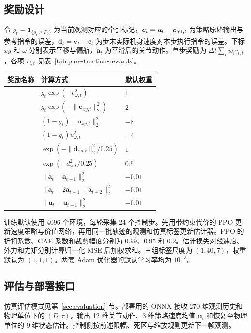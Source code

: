 \begin{samepage}
\subsection{奖励设计}
令 $g_t=\mathbf 1_{\{\rho_t\ge F_0\}}$ 为当前观测对应的牵引标记，$\bm e_t=\bm u_t-\bm c_{{\rm ref},t}$ 为策略原始输出与参考指令的误差，$\bm d_t=\bm v_t-\bm c_t$ 为步末实际机身速度对本步执行指令的误差。下标 $xy$ 和 $\omega$ 分别表示平移与偏航，$\tilde{\bm a}_t$ 为平滑后的关节动作。单步奖励为 $\Delta t\sum_i w_i r_{i,t}$，各项 $r_{i,t}$ 见表~\ref{tab:pure-traction-rewards}。

\par\nobreak\medskip\noindent
\begin{minipage}{\linewidth}
\captionsetup{hypcap=false}
\small
\begin{tabularx}{\linewidth}{@{}P{48mm}Y>{\centering\arraybackslash}p{19mm}@{}}
\toprule
\textbf{奖励名称} & \textbf{计算方式} & \textbf{默认权重} \\
\midrule
{} & $g_t\exp(-e_{\omega,t}^2)$ & $1$ \\
 & $g_t\exp(-\|\bm e_{xy,t}\|_2^2)$ & $2$ \\
 & $(1-g_t)\|\bm u_{xy,t}\|_2^2$ & $-8$ \\
 & $(1-g_t)u_{\omega,t}^2$ & $-4$ \\
 & $\exp(-\|\bm d_{xy,t}\|_2^2/0.25)$ & $1$ \\
 & $\exp(-d_{\omega,t}^2/0.25)$ & $0.5$ \\
 & $\|\tilde{\bm a}_t-\tilde{\bm a}_{t-1}\|_2^2$ & $-0.01$ \\
 & $\|\tilde{\bm a}_t-2\tilde{\bm a}_{t-1}+\tilde{\bm a}_{t-2}\|_2^2$ & $-0.01$ \\
 & $\|\bm u_t-\bm u_{t-1}\|_2^2$ & $-0.01$ \\
\bottomrule
\end{tabularx}
\label{tab:pure-traction-rewards}
\end{minipage}
\par
\end{samepage}

训练默认使用 4096 个环境，每轮采集 24 个控制步。先用带约束代价的 PPO 更新速度策略与价值网络，再用同一批轨迹的观测和仿真标签更新估计器。PPO 的折扣系数、GAE 系数和裁剪幅度分别为 $0.99$、$0.95$ 和 $0.2$。估计损失对线速度、外力和力矩分别计算归一化 MSE 后加权求和。三组标签尺度为 $(1,40,7)$，权重默认为 $(1,1,1)$。两套 Adam 优化器的默认学习率均为 $10^{-3}$。

\subsection{评估与部署接口}
仿真评估模式见第~\ref{sec:evaluation} 节。部署用的 ONNX 接收 270 维观测历史和物理单位下的 $(D,\tau)$，输出 12 维关节动作、3 维策略速度均值 $\bm u_t$ 和恢复至物理单位的 9 维状态估计。控制侧按前述限幅、死区与缩放规则更新下一帧观测。
